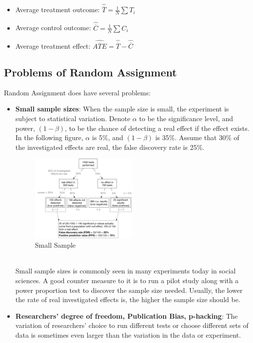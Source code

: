 \begin{itemize}
\item Average treatment outcome: $\hat{\overline{T}} = \frac{1}{N}\sum{T_i}$
\item Average control outcome: $\hat{\overline{C}} = \frac{1}{N}\sum{C_i}$
\item Average treatment effect: $\hat{\overline{ATE}} = \hat{\overline{T}} - \hat{\overline{C}}$
\end{itemize}

\subsection{Problems of Random Assignment}
Random Assignment does have several problems:
\begin{itemize}
\item \textbf{Small sample sizes}: When the sample size is small, the experiment is subject to statistical variation. Denote $\alpha$ to be the significance level, and power, $(1-\beta)$, to be the chance of detecting a real effect if the effect exists. In the following figure, $\alpha$ is 5\%, and $(1-\beta)$ is 35\%. Assume that 30\% of the investigated effects are real, the false discovery rate is 25\%. 
\begin{figure}[ht]
  \begin{center}
    \includegraphics[width=0.5\textwidth]{figures/PPV_tree.jpeg}
    \caption{Small Sample
      }
    \label{fig:Small Sample}
  \end{center}
\end{figure}
\\
Small sample sizes is commonly seen in many experiments today in social sciences. A good counter measure to it is to run a pilot study along with a power proportion test to discover the sample size needed. Usually, the lower the rate of real investigated effects is, the higher the sample size should be.
\item \textbf{Researchers' degree of freedom, Publication Bias, p-hacking}: The variation of researchers' choice to run different tests or choose different sets of data is sometimes even larger than the variation in the data or experiment.
\end{itemize}

